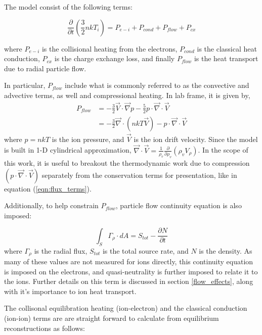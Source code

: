 \documentclass[aip, pop, preprint]{revtex4-1}
\begin{document}
The model consist of the following terms:

\begin{equation}\label{eqn:balance}
\frac{\partial}{\partial t}\left(\frac{3}{2}nkT_{i}\right) = P_{e-i} + P_{cond} + P_{flow} + P_{cx} %
\end{equation}

where $P_{e-i}$ is the collisional heating from the electrons, $P_{cond}$ is the classical heat conduction, $P_{cx}$ is the charge exchange loss, and finally $P_{flow}$ is the heat transport due to radial particle flow. 

In particular, $P_{flow}$ include what is commonly referred to as the convective and advective terms, as well and compressional heating. In lab frame, it is given by,
\begin{align}
P_{flow} & = -\frac{3}{2}\vec{V}\cdot\vec{\nabla}p - \frac{5}{2}p\cdot\vec{\nabla}\cdot\vec{V}\\
& = -\frac{3}{2}\vec{\nabla}\cdot(nkT\vec{V}) - p\cdot\vec{\nabla}\cdot\vec{V}\label{eqn:flux_terms}
\end{align} 
where $p = nkT$ is the ion pressure, and $\vec{V}$ is the ion drift velocity. Since the model is built in 1-D cylindrical approximation, $\vec{\nabla}\cdot\vec{V} = \frac{1}{\rho_v}\frac{\partial}{\partial\rho_v}(\rho_v V_{\rho})$. In the scope of this work, it is useful to breakout
the thermodynamic work due to compression $  ( p\cdot\vec{\nabla}\cdot\vec{V} )
$ separately from the conservation terms for presentation, like in equation
(\ref{eqn:flux_terms}). 

Additionally, to help constrain $P_{flow}$, particle flow continuity equation is also imposed:

\begin{equation}\label{eqn:cont}
\int_{S} \Gamma_{\rho}\cdot dA = S_{tot}-\frac{\partial N}{\partial t}
\end{equation}
where $\Gamma_{\rho}$ is the radial flux, $S_{tot}$ is the total source rate, and $N$ is the density. As many of these values are not measured for ions directly, this continuity equation is imposed on the electrons, and quasi-neutrality is further imposed to relate it to the ions. Further details on this term is discussed in section \ref{flow_effects}, along with it's importance to ion heat transport. 


The collisonal equilibration heating (ion-electron) and the classical conduction (ion-ion) terms are
are straight forward to calculate from equilibrium reconstructions as follows\cite{Huba2016NRLFORMULARY,Braginskii1965TransportPlasma}:
\end{document}
